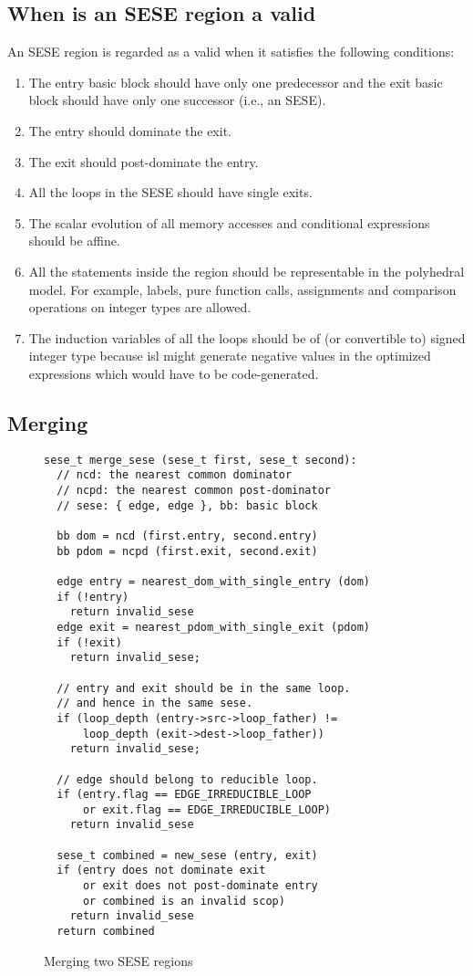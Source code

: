 \documentclass{sig-alternate}
\begin{document}
\subsection{When is an SESE region a valid }
\label{subsec:validity}
An SESE region is regarded as a valid \SCoP{} when it satisfies the following
conditions:
\begin{enumerate}
\item The entry basic block should have only one predecessor and the exit
  basic block should have only one successor (i.e., an SESE).
\item The entry should dominate the exit.
\item The exit should post-dominate the entry.
\item All the loops in the SESE should have single exits.
\item The scalar evolution of all memory accesses and conditional expressions
  should be affine.
\item All the statements inside the region should be representable in the
  polyhedral model.  For example, labels, pure function calls, assignments and
  comparison operations on integer types are allowed.
\item The induction variables of all the loops should be of (or convertible to)
  signed integer type because isl might generate negative values in the optimized
  expressions which would have to be code-generated.
\end{enumerate}

\subsection{Merging }
\label{subsec:merge-sese}

\begin{figure}
\begin{verbatim}
sese_t merge_sese (sese_t first, sese_t second):
  // ncd: the nearest common dominator
  // ncpd: the nearest common post-dominator
  // sese: { edge, edge }, bb: basic block

  bb dom = ncd (first.entry, second.entry)
  bb pdom = ncpd (first.exit, second.exit)

  edge entry = nearest_dom_with_single_entry (dom)
  if (!entry)
    return invalid_sese
  edge exit = nearest_pdom_with_single_exit (pdom)
  if (!exit)
    return invalid_sese;

  // entry and exit should be in the same loop.
  // and hence in the same sese.
  if (loop_depth (entry->src->loop_father) !=
      loop_depth (exit->dest->loop_father))
    return invalid_sese;

  // edge should belong to reducible loop.
  if (entry.flag == EDGE_IRREDUCIBLE_LOOP
      or exit.flag == EDGE_IRREDUCIBLE_LOOP)
    return invalid_sese

  sese_t combined = new_sese (entry, exit)
  if (entry does not dominate exit
      or exit does not post-dominate entry
      or combined is an invalid scop)
    return invalid_sese
  return combined
\end{verbatim}
\caption{Merging two SESE regions}
\label{fig:merge-sese}
\end{figure}
\end{document}
